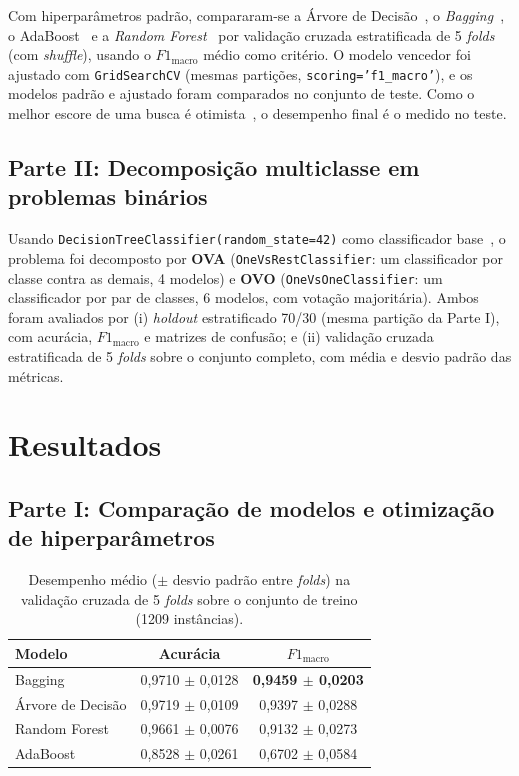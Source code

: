\documentclass[11pt, a4paper]{article}
\begin{document}
Com hiperparâmetros padrão, compararam-se a Árvore de Decisão~\cite{breiman1984cart}, o \textit{Bagging}~\cite{breiman1996bagging}, o AdaBoost~\cite{freund1997} e a \textit{Random Forest}~\cite{breiman2001rf} por validação cruzada estratificada de 5 \textit{folds} (com \textit{shuffle}), usando o $F1_{\text{macro}}$ médio como critério. O modelo vencedor foi ajustado com \texttt{GridSearchCV} (mesmas partições, \texttt{scoring='f1\_macro'}), e os modelos padrão e ajustado foram comparados no conjunto de teste. Como o melhor escore de uma busca é otimista~\cite{cawley2010}, o desempenho final é o medido no teste.

\subsection{Parte II: Decomposição multiclasse em problemas binários}

Usando \texttt{DecisionTreeClassifier(random\_state=42)} como classificador base~\cite{galar2011}, o problema foi decomposto por \textbf{OVA} (\texttt{OneVsRestClassifier}: um classificador por classe contra as demais, 4 modelos) e \textbf{OVO} (\texttt{OneVsOneClassifier}: um classificador por par de classes, 6 modelos, com votação majoritária). Ambos foram avaliados por (i) \textit{holdout} estratificado 70/30 (mesma partição da Parte I), com acurácia, $F1_{\text{macro}}$ e matrizes de confusão; e (ii) validação cruzada estratificada de 5 \textit{folds} sobre o conjunto completo, com média e desvio padrão das métricas.

\section{Resultados}

\subsection{Parte I: Comparação de modelos e otimização de hiperparâmetros}

\begin{table}[htbp]
\centering
\caption{Desempenho médio ($\pm$ desvio padrão entre \textit{folds}) na validação cruzada de 5 \textit{folds} sobre o conjunto de treino (1209 instâncias).}
\label{tab:cv_modelos}
\begin{tabular}{lcc}
\toprule
Modelo & Acurácia & $F1_{\mathrm{macro}}$ \\
\midrule
Bagging           & 0{,}9710 $\pm$ 0{,}0128 & \textbf{0{,}9459 $\pm$ 0{,}0203} \\
Árvore de Decisão & 0{,}9719 $\pm$ 0{,}0109 & 0{,}9397 $\pm$ 0{,}0288 \\
Random Forest     & 0{,}9661 $\pm$ 0{,}0076 & 0{,}9132 $\pm$ 0{,}0273 \\
AdaBoost          & 0{,}8528 $\pm$ 0{,}0261 & 0{,}6702 $\pm$ 0{,}0584 \\
\bottomrule
\end{tabular}
\end{table}
\end{document}
